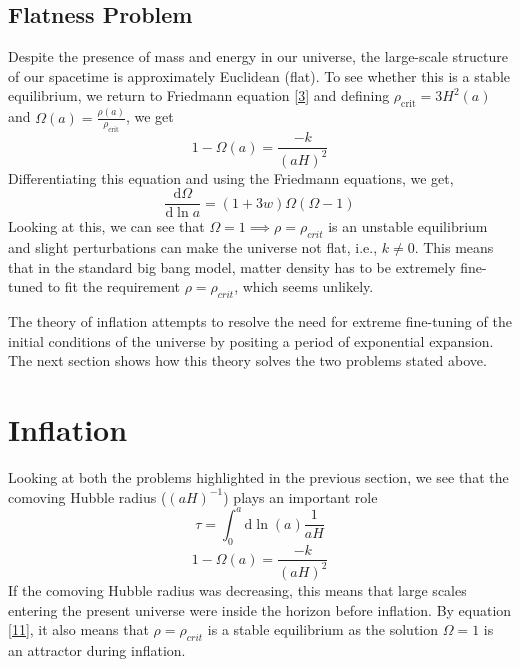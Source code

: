\documentclass[aps,prd,reprint,preprintnumbers,showpacs,floatfix,nofootinbib,superscript address]{revtex4-2}
\begin{document}
\subsection{Flatness Problem}
Despite the presence of mass and energy in our universe, the large-scale structure of our spacetime is approximately Euclidean (flat). To see whether this is a stable equilibrium, we return to Friedmann equation \ref{3} and defining $\rho_{\text{crit}} = 3H^2(a)$ and $\Omega(a) = \frac{\rho(a)}{\rho_{\text{crit}}}$, we get
\begin{equation}
    1 - \Omega(a) = \frac{-k}{(aH)^2}
\end{equation}
Differentiating this equation and using the Friedmann equations, we get,
\begin{equation}
    \frac{\mathrm{d}\Omega}{\mathrm{d} \ln a} = (1+3w)\Omega(\Omega-1)
\end{equation}
Looking at this, we can see that $\Omega = 1  \implies \rho = \rho_{crit}$ is an unstable equilibrium and slight perturbations can make the universe not flat, i.e., $k \neq 0$. This means that in the standard big bang model, matter density has to be extremely fine-tuned to fit the requirement $\rho = \rho_{crit}$, which seems unlikely.

The theory of inflation attempts to resolve the need for extreme fine-tuning of the initial conditions of the universe by positing a period of exponential expansion. The next section shows how this theory solves the two problems stated above.

\section{Inflation}\label{Inflation}
Looking at both the problems highlighted in the previous section, we see that the comoving Hubble radius ($(aH)^{-1}$) plays an important role
\begin{equation}    \label{10}
    \tau = \int_{0}^{a} \mathrm{d} \ln (a) \frac{1}{aH}
\end{equation}
\begin{equation} \label{11}
    1 - \Omega (a) = \frac{-k}{(aH)^2}
\end{equation}
If the comoving Hubble radius was decreasing, this means that large scales entering the present universe were inside the horizon before inflation. By equation \ref{11}, it also means that $\rho = \rho_{crit}$ is a stable equilibrium as the solution $\Omega = 1$ is an attractor during inflation.
\end{document}
